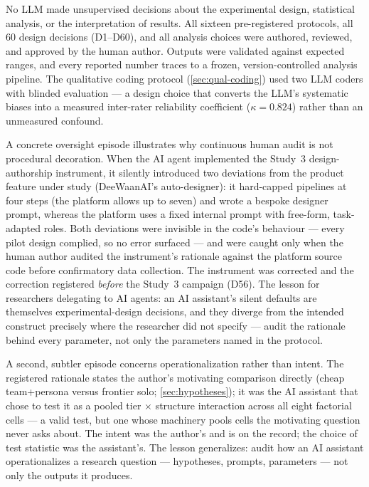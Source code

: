 \documentclass[12pt,a4paper]{article}
\begin{document}
No LLM made unsupervised decisions about the experimental design, statistical
analysis, or the interpretation of results. All sixteen pre-registered protocols,
all 60 design decisions (D1--D60), and all analysis choices were authored,
reviewed, and approved by the human author. Outputs were
validated against expected ranges, and every reported number traces to a frozen,
version-controlled analysis pipeline. The qualitative coding protocol
(\cref{sec:qual-coding}) used two LLM coders with blinded evaluation --- a
design choice that converts the LLM's systematic biases into a measured
inter-rater reliability coefficient ($\kappa = 0.824$) rather than an unmeasured
confound.

A concrete oversight episode illustrates why continuous human audit is not
procedural decoration. When the AI agent implemented the Study~3
design-authorship instrument, it silently introduced two deviations from the
product feature under study (DeeWaanAI's auto-designer): it hard-capped
pipelines at four steps (the platform allows up to seven) and wrote a bespoke
designer prompt, whereas the platform uses a fixed internal prompt with
free-form, task-adapted roles. Both deviations were invisible in the code's
behaviour --- every pilot design complied, so no error surfaced --- and were
caught only when the human author audited the instrument's rationale against
the platform source code before confirmatory data collection. The instrument
was corrected and the correction registered \emph{before} the Study~3
campaign (D56). The lesson for researchers delegating to AI agents: an AI
assistant's silent defaults are themselves experimental-design decisions, and
they diverge from the intended construct precisely where the researcher did
not specify --- audit the rationale behind every parameter, not only the
parameters named in the protocol.

A second, subtler episode concerns operationalization rather than intent. The
registered rationale states the author's motivating comparison directly (cheap
team+persona versus frontier solo; \cref{sec:hypotheses}); it was the AI
assistant that chose to test it as a pooled tier $\times$ structure
interaction across all eight factorial cells --- a valid test, but one whose
machinery pools cells the motivating question never asks about. The intent
was the author's and is on the record; the choice of test statistic was the
assistant's. The lesson generalizes: audit how an AI assistant
operationalizes a research question --- hypotheses, prompts, parameters ---
not only the outputs it produces.
\end{document}
